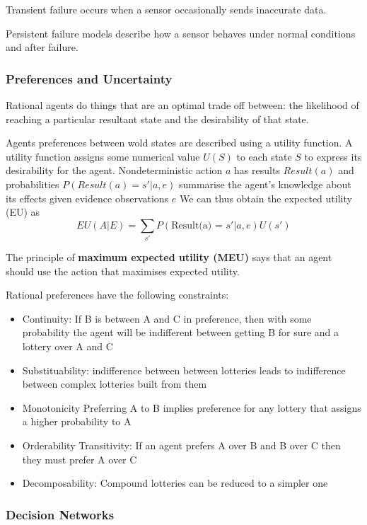 \documentclass{article}
\begin{document}
Transient failure occurs when a sensor occasionally sends inaccurate data. 

Persistent failure models describe how a sensor behaves under normal conditions and after failure.

\subsubsection{Preferences and Uncertainty}

Rational agents do things that are an optimal trade off between: the likelihood of reaching a particular resultant state and the desirability of that state. 

Agents preferences between wold states are described using a utility function. A utility function assigns some numerical value $U(S)$ to each state $S$ to express its desirability for the agent. Nondeterministic action $a$ has results $Result(a)$ and probabilities $P(Result(a) = s'|a,e)$ summarise the agent's knowledge about its effects given evidence observations $e$ We can thus obtain the expected utility (EU) as $$EU(A|E) = \sum_{s'}P(\text{Result(a) = } s'|a,e)U(s')$$

The principle of \textbf{maximum expected utility (MEU)} says that an agent should use the action that maximises expected utility. 

Rational preferences have the following constraints:
\begin{itemize}
    \item Continuity: If B is between A and C in preference, then with some probability the agent will be indifferent between getting B for sure and a lottery over A and C
    \item Substituability: indifference between between lotteries leads to indifference between complex lotteries built from them
    \item Monotonicity Preferring A to B implies preference for any lottery that assigns a higher probability to A
    \item Orderability 
    Transitivity: If an agent prefers A over B and B over C then they must prefer A over C
    \item Decomposability: Compound lotteries can be reduced to a simpler one
\end{itemize}

\subsubsection{Decision Networks}
\end{document}
